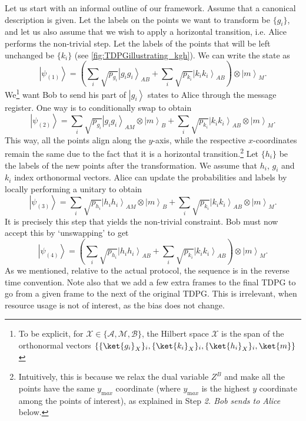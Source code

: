 \documentclass{theoretics}
\newcommand{\atul}[1]{#1} %
\begin{document}
Let us start with an informal outline of our framework.
Assume that a canonical description is given. Let the
labels on the points we want to transform be $\{g_{i}\}$,
and let us also assume that we wish to apply a horizontal transition, i.e. Alice performs the non-trivial step. Let the labels of the
points that will be left unchanged be $\{k_{i}\}$
(see  \cref{fig:TDPGillustrating_kgh}). We can write the state as
\begin{displaymath}
  \left|\psi_{(1)}\right\rangle =\left(\sum_{i}\sqrt{p_{g_{i}}}\left|g_{i}g_{i}\right\rangle _{AB}+\sum_{i}\sqrt{p_{k_{i}}}\left|k_{i}k_{i}\right\rangle _{AB}\right)\otimes\left|m\right\rangle _{M}.
\end{displaymath}
We\footnote{To be explicit, for $\mathcal{X} \in \{\mathcal{A},\mathcal{M},\mathcal{B}\}$, the Hilbert space $\mathcal{X}$ is the span of the orthonormal vectors $\{\{\ket{g_i}_X\}_i,\{\ket{k_i}_X\}_i,\{\ket{h_i}_X\}_i,\ket{m}\}$} want Bob to send his part of $\left|g_{i}\right\rangle $ states
to Alice through the message register. One way is to conditionally
swap to obtain
\begin{displaymath}
  \left|\psi_{(2)}\right\rangle =\sum_{i}\sqrt{p_{g_{i}}}\left|g_{i}g_{i}\right\rangle _{AM}\otimes\left|m\right\rangle _{B}+\sum_{i}\sqrt{p_{k_{i}}}\left|k_{i}k_{i}\right\rangle _{AB}\otimes\left|m\right\rangle _{M}.
\end{displaymath}
This way, all the points align along the $y$-axis, while the respective $x$-coordinates remain the same due to the fact that it is a horizontal transition.\footnote{\atul{Intuitively, this is because we relax the dual variable $Z^B$ and make all the points have the same $y_{\mathrm max}$ coordinate (where $y_{\mathrm max}$ is the highest $y$ coordinate among the points of interest), as explained in Step \emph{2. Bob sends to Alice} below.}}
Let $\{h_{i}\}$ be the labels of the new points after the transformation.
We assume that $h_{i}$, $g_{i}$ and $k_{i}$ index orthonormal vectors.
Alice can update the probabilities and labels by locally performing
a unitary to obtain
\begin{displaymath}
  \left|\psi_{(3)}\right\rangle =\sum_{i}\sqrt{p_{h_{i}}}\left|h_{i}h_{i}\right\rangle _{AM}\otimes\left|m\right\rangle _{B}+\sum_{i}\sqrt{p_{k_{i}}}\left|k_{i}k_{i}\right\rangle _{AB}\otimes\left|m\right\rangle _{M}.
\end{displaymath}
It is precisely this step that yields the non-trivial constraint.
Bob must now accept this by `unswapping' to get
\begin{displaymath}
  \left|\psi_{(4)}\right\rangle =\left(\sum_{i}\sqrt{p_{h_{i}}}\left|h_{i}h_{i}\right\rangle _{AB}+\sum_{i}\sqrt{p_{k_{i}}}\left|k_{i}k_{i}\right\rangle _{AB}\right)\otimes\left|m\right\rangle _{M}.
\end{displaymath}
As we mentioned, relative to the actual protocol, the sequence is in the reverse time convention. Note also that we add a few extra frames to the final
TDPG to go from a given frame to the next of the original TDPG. This
is irrelevant, when resource usage is not of interest, as the bias
does not change.
\end{document}
